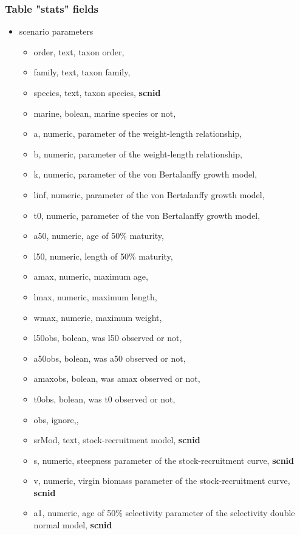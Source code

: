 \documentclass[a4paper]{article}\usepackage{graphicx, color}
\begin{document}
\subsubsection{Table "stats" fields}

\begin{itemize}
	\item scenario parameters
	\begin{itemize}
		\item order, text, taxon order, 
		\item family, text, taxon family, 
		\item species, text, taxon species, {\bf scnid}
		\item marine, bolean, marine species or not,
		\item a, numeric, parameter of the weight-length relationship,
		\item b, numeric, parameter of the weight-length relationship,
		\item k, numeric, parameter of the von Bertalanffy growth model,
		\item linf, numeric, parameter of the von Bertalanffy growth model,
		\item t0, numeric, parameter of the von Bertalanffy growth model,
		\item a50, numeric, age of 50\% maturity, 
		\item l50, numeric, length of 50\% maturity, 
		\item amax, numeric, maximum age, 
		\item lmax, numeric, maximum length, 
		\item wmax, numeric, maximum weight, 
		\item l50obs, bolean, was l50 observed or not,
		\item a50obs, bolean, was a50 observed or not,
		\item amaxobs, bolean, was amax observed or not,
		\item t0obs, bolean, was t0 observed or not,
		\item obs, ignore,,
		\item srMod, text, stock-recruitment model, {\bf scnid}
		\item s, numeric, steepness parameter of the stock-recruitment curve, {\bf scnid}
		\item v, numeric, virgin biomass parameter of the stock-recruitment curve, {\bf scnid}
		\item a1, numeric, age of 50\% selectivity parameter of the selectivity double normal model, {\bf scnid}

\end{itemize}
\end{itemize}
\end{document}
